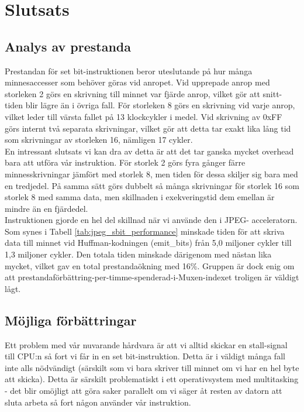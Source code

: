\documentclass[a4paper]{article}
\begin{document}
\section{Slutsats}

\subsection{Analys av prestanda}

Prestandan för set bit-instruktionen beror uteslutande på hur många
minnesaccesser som behöver göras vid anropet. Vid upprepade anrop med
storleken 2 görs en skrivning till minnet var fjärde anrop, vilket gör
att snitt-tiden blir lägre än i övriga fall. För storleken 8 görs en
skrivning vid varje anrop, vilket leder till värsta fallet på 13
klockcykler i medel. Vid skrivning av 0xFF görs internt två separata
skrivningar, vilket gör att detta tar exakt lika lång tid som
skrivningar av storleken 16, nämligen 17 cykler.\\

En intressant slutsats vi kan dra av detta är att det tar ganska mycket
overhead bara att utföra vår instruktion. För storlek 2 görs fyra gånger
färre minnesskrivningar jämfört med storlek 8, men tiden för dessa
skiljer sig bara med en tredjedel. På samma sätt görs dubbelt så många
skrivningar för storlek 16 som storlek 8 med samma data, men skillnaden
i exekveringstid dem emellan är mindre än en fjärdedel.\\

Instruktionen gjorde en hel del skillnad när vi använde den i JPEG-
acceleratorn. Som synes i Tabell \ref{tab:jpeg_sbit_performance}
minskade tiden för att skriva data till minnet vid Huffman-kodningen
(emit\_bits) från 5,0 miljoner cykler till 1,3 miljoner cykler. Den
totala tiden minskade därigenom med nästan lika mycket, vilket gav en
total prestandaökning med 16\%. Gruppen är dock enig om att
prestandaförbättring-per-timme-spenderad-i-Muxen-indexet troligen är
väldigt lågt.\\


\subsection{Möjliga förbättringar}

Ett problem med vår nuvarande hårdvara är att vi alltid skickar en
stall-signal till CPU:n så fort vi får in en set bit-instruktion. Detta
är i väldigt många fall inte alls nödvändigt (särskilt som vi bara
skriver till minnet om vi har en hel byte att skicka). Detta är särskilt
problematiskt i ett operativsystem med multitasking - det blir omöjligt
att göra saker parallelt om vi säger åt resten av datorn att sluta
arbeta så fort någon använder vår instruktion.\\
\end{document}
